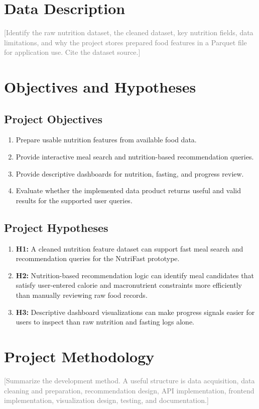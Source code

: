 \documentclass[12pt]{report}
\newcommand{\placeholder}[1]{\textcolor{gray}{[#1]}}
\begin{document}
\section{Data Description}
\placeholder{Identify the raw nutrition dataset, the cleaned dataset, key nutrition fields, data limitations, and why the project stores prepared food features in a Parquet file for application use. Cite the dataset source.}

\section{Objectives and Hypotheses}
\subsection{Project Objectives}
\begin{enumerate}
    \item Prepare usable nutrition features from available food data.
    \item Provide interactive meal search and nutrition-based recommendation queries.
    \item Provide descriptive dashboards for nutrition, fasting, and progress review.
    \item Evaluate whether the implemented data product returns useful and valid results for the supported user queries.
\end{enumerate}

\subsection{Project Hypotheses}
\begin{enumerate}
    \item \textbf{H1:} A cleaned nutrition feature dataset can support fast meal search and recommendation queries for the NutriFast prototype.
    \item \textbf{H2:} Nutrition-based recommendation logic can identify meal candidates that satisfy user-entered calorie and macronutrient constraints more efficiently than manually reviewing raw food records.
    \item \textbf{H3:} Descriptive dashboard visualizations can make progress signals easier for users to inspect than raw nutrition and fasting logs alone.
\end{enumerate}

\section{Project Methodology}
\placeholder{Summarize the development method. A useful structure is data acquisition, data cleaning and preparation, recommendation design, API implementation, frontend implementation, visualization design, testing, and documentation.}
\end{document}
